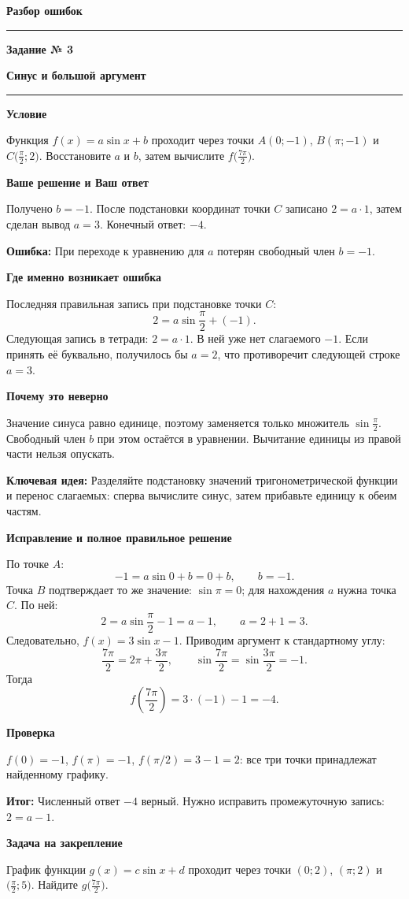 \documentclass[a4paper,11pt]{article}
\newcommand{\taskheading}[2]{%
  \phantomsection\label{task:#1}%
  {\color{accent}\large\bfseries Задание № #1}\par\vspace{2mm}%
  {\LARGE\bfseries\color{ink}#2}\par\vspace{3mm}\noindent\color{accent}\rule{\linewidth}{0.5pt}\color{black}\par}
\newcommand{\field}[1]{\par\textbf{#1}\par\nobreak}
\newcommand{\idea}{\textcolor{blue!60!black}{\textbf{Ключевая идея:}}}
\newcommand{\mistake}{\textcolor{red!75!black}{\textbf{Ошибка:}}}
\newcommand{\outcome}{\textcolor{teal!60!black}{\textbf{Итог:}}}
\begin{document}
\thispagestyle{empty}
\vspace*{0.32\textheight}
\begin{center}
{\fontsize{29}{36}\selectfont\bfseries\color{ink}Разбор ошибок}\par
\vspace{5mm}
{\color{accent}\rule{64mm}{0.65pt}}
\end{center}
\clearpage

\taskheading{3}{Синус и большой аргумент}
\field{Условие}
Функция $f(x)=a\sin x+b$ проходит через точки $A(0;-1)$, $B(\pi;-1)$ и $C\bigl(\frac{\pi}{2};2\bigr)$. Восстановите $a$ и $b$, затем вычислите $f\bigl(\frac{7\pi}{2}\bigr)$.

\field{Ваше решение и Ваш ответ}
Получено $b=-1$. После подстановки координат точки $C$ записано $2=a\cdot1$, затем сделан вывод $a=3$. Конечный ответ: $-4$.

\mistake\; При переходе к уравнению для $a$ потерян свободный член $b=-1$.

\field{Где именно возникает ошибка}
Последняя правильная запись при подстановке точки $C$:
\[
2=a\sin\frac{\pi}{2}+(-1).
\]
Следующая запись в тетради: $2=a\cdot1$. В ней уже нет слагаемого $-1$. Если принять её буквально, получилось бы $a=2$, что противоречит следующей строке $a=3$.

\field{Почему это неверно}
Значение синуса равно единице, поэтому заменяется только множитель $\sin\frac{\pi}{2}$. Свободный член $b$ при этом остаётся в уравнении. Вычитание единицы из правой части нельзя опускать.

\idea\; Разделяйте подстановку значений тригонометрической функции и перенос слагаемых: сперва вычислите синус, затем прибавьте единицу к обеим частям.

\field{Исправление и полное правильное решение}
По точке $A$:
\[
-1=a\sin0+b=0+b,\qquad b=-1.
\]
Точка $B$ подтверждает то же значение: $\sin\pi=0$; для нахождения $a$ нужна точка $C$. По ней:
\[
2=a\sin\frac{\pi}{2}-1=a-1,
\qquad a=2+1=3.
\]
Следовательно, $f(x)=3\sin x-1$. Приводим аргумент к стандартному углу:
\[
\frac{7\pi}{2}=2\pi+\frac{3\pi}{2},\qquad
\sin\frac{7\pi}{2}=\sin\frac{3\pi}{2}=-1.
\]
Тогда
\[
f\!\left(\frac{7\pi}{2}\right)=3\cdot(-1)-1=-4.
\]
\field{Проверка}
$f(0)=-1$, $f(\pi)=-1$, $f(\pi/2)=3-1=2$: все три точки принадлежат найденному графику.

\outcome\; Численный ответ $-4$ верный. Нужно исправить промежуточную запись: $2=a-1$.

\field{Задача на закрепление}
График функции $g(x)=c\sin x+d$ проходит через точки $(0;2)$, $(\pi;2)$ и $\bigl(\frac{\pi}{2};5\bigr)$. Найдите $g\bigl(\frac{7\pi}{2}\bigr)$.
\clearpage
\end{document}
